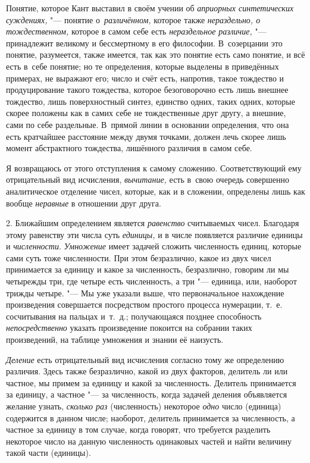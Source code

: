 Понятие, которое Кант выставил в своём учении об
{\em априорных синтетических суждениях,} "--- понятие о~{\em различённом,}
которое также {\em нераздельно, о тождественном,} которое в самом себе есть
{\em нераздельное различие,} "--- принадлежит великому и бессмертному в его
философии. В~созерцании это понятие, разумеется, также имеется, так как это
понятие есть само понятие, и всё есть в~себе понятие; но те определения,
которые выделены в приведённых примерах, не выражают его; число и счёт
есть, напротив, такое тождество и продуцирование такого тождества, которое
безоговорочно есть лишь внешнее тождество, лишь поверхностный синтез, единство
одних, таких одних, которые скорее положены как в самих себе не
тождественные друг другу, а внешние, сами по себе раздельные. В~прямой линии
в основании определения, что она есть кратчайшее расстояние между двумя
точками, должен лечь скорее лишь момент абстрактного тождества, лишённого
различия в самом себе.

Я возвращаюсь от этого отступления к самому сложению. Соответствующий ему
отрицательный вид исчисления, {\em вычитание,} есть в~свою очередь совершенно
аналитическое отделение чисел, которые, как и в сложении, определены лишь как
вообще {\em неравные} в отношении друг друга.

2. Ближайшим определением является {\em равенство} считываемых
чисел. Благодаря этому равенству эти числа
суть {\em единицы,} и в числе появляется различие единицы и {\em численности}.
{\em Умножение} имеет задачей сложить численность единиц,
которые сами суть тоже численности. При этом безразлично, какое из двух чисел
принимается за единицу и какое за численность, безразлично, говорим ли мы
четырежды три, где четыре есть численность, а три "--- единица, или, наоборот
трижды четыре. "--- Мы уже указали выше, что первоначальное нахождение
произведения совершается посредством простого процесса нумерации, т.~е.
сосчитывания на пальцах и~т.~д.; получающаяся позднее способность
{\em непосредственно} указать произведение покоится на собрании таких
произведений, на таблице умножения и знании её наизусть.

{\em Деление} есть отрицательный вид исчисления согласно тому же определению
различия. Здесь также безразлично, какой из двух факторов, делитель ли или
частное, мы примем за единицу и какой за численность. Делитель принимается за
единицу, а частное "--- за численность, когда задачей деления объявляется
желание узнать, {\em сколько раз} (численность) некоторое {\em одно} число
(единица) содержится в данном числе; наоборот, делитель принимается за
численность, а частное за единицу в том случае, когда говорят, что требуется
разделить некоторое число на данную численность одинаковых частей и найти
величину такой части (единицы).

